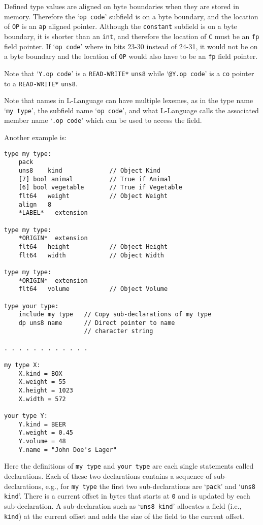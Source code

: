 \documentclass[12pt]{article}
\newenvironment{indpar}[1][0.3in]%
	{\begin{list}{}%
		     {\setlength{\itemsep}{0in}%
		      \setlength{\topsep}{0in}%
		      \setlength{\parsep}{1ex}%
		      \setlength{\labelwidth}{#1}%
		      \setlength{\leftmargin}{#1}%
		      \addtolength{\leftmargin}{\labelsep}}%
	 \item}%
	{\end{list}}
\begin{document}
Defined type values are aligned on byte boundaries when
they are stored in memory.  Therefore the `{\tt op code}' subfield
is on a byte boundary, and
the location of {\tt OP} is an {\tt ap} aligned pointer.  Although
the {\tt constant} subfield is on a byte boundary, it is
shorter than an {\tt int}, and therefore the
location of {\tt C} must be an {\tt fp} field pointer.
If `{\tt op code}' where in bits 23-30 instead of 24-31, it would
not be on a byte boundary and the location of {\tt OP} would
also have to be an {\tt fp} field pointer.

Note that `{\tt Y.op code}' is a {\tt *READ-WRITE*}
{\tt uns8} while `{\tt @Y.op code}' is a {\tt co} pointer to
a {\tt *READ-WRITE*} {\tt uns8}.

Note that names in L-Language can have multiple lexemes, as in
the type name `{\tt my type}', the subfield name `{\tt op code}',
and what L-Language calls the
associated member name `{\tt .op code}' which can be used to access
the field.

Another example is:

\begin{indpar}\begin{verbatim}
type my type:
    pack
    uns8    kind             // Object Kind
    [7] bool animal          // True if Animal
    [6] bool vegetable       // True if Vegetable
    flt64   weight           // Object Weight
    align   8
    *LABEL*   extension

type my type:
    *ORIGIN*  extension
    flt64   height           // Object Height
    flt64   width            // Object Width

type my type:
    *ORIGIN*  extension
    flt64   volume           // Object Volume

type your type:
    include my type   // Copy sub-declarations of my type
    dp uns8 name      // Direct pointer to name
                      // character string

. . . . . . . . . . . .

my type X:
    X.kind = BOX
    X.weight = 55
    X.height = 1023
    X.width = 572

your type Y:
    Y.kind = BEER
    Y.weight = 0.45
    Y.volume = 48
    Y.name = "John Doe's Lager"
\end{verbatim}\end{indpar}

Here the definitions of {\tt my type} and {\tt your type} are each
single statements called declarations.  Each of these two
declarations contains a sequence of sub-declarations, e.g.,
for {\tt my type} the first two sub-declarations are
`{\tt pack}' and `{\tt uns8 kind}'.  There is a current
offset in bytes that starts at {\tt 0} and is updated by each sub-declaration.
A sub-declaration such as `{\tt uns8 kind}' allocates a field
(i.e., {\tt kind})
at the current offset and adds the size of the field to the
current offset.
\end{document}
